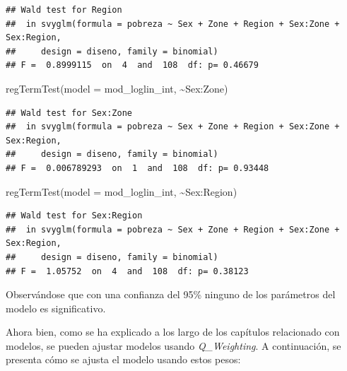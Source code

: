 \documentclass[
  12pt,
]{book}
\newenvironment{Shaded}{\begin{snugshade}}{\end{snugshade}}
\newcommand{\AttributeTok}[1]{\textcolor[rgb]{0.77,0.63,0.00}{#1}}
\newcommand{\FunctionTok}[1]{\textcolor[rgb]{0.00,0.00,0.00}{#1}}
\newcommand{\NormalTok}[1]{#1}
\newcommand{\SpecialCharTok}[1]{\textcolor[rgb]{0.00,0.00,0.00}{#1}}
\begin{document}
\begin{verbatim}
## Wald test for Region
##  in svyglm(formula = pobreza ~ Sex + Zone + Region + Sex:Zone + Sex:Region, 
##     design = diseno, family = binomial)
## F =  0.8999115  on  4  and  108  df: p= 0.46679
\end{verbatim}

\begin{Shaded}
\begin{Highlighting}[]
  \FunctionTok{regTermTest}\NormalTok{(}\AttributeTok{model =}\NormalTok{ mod\_loglin\_int, }\SpecialCharTok{\textasciitilde{}}\NormalTok{Sex}\SpecialCharTok{:}\NormalTok{Zone)}
\end{Highlighting}
\end{Shaded}

\begin{verbatim}
## Wald test for Sex:Zone
##  in svyglm(formula = pobreza ~ Sex + Zone + Region + Sex:Zone + Sex:Region, 
##     design = diseno, family = binomial)
## F =  0.006789293  on  1  and  108  df: p= 0.93448
\end{verbatim}

\begin{Shaded}
\begin{Highlighting}[]
  \FunctionTok{regTermTest}\NormalTok{(}\AttributeTok{model =}\NormalTok{ mod\_loglin\_int, }\SpecialCharTok{\textasciitilde{}}\NormalTok{Sex}\SpecialCharTok{:}\NormalTok{Region)}
\end{Highlighting}
\end{Shaded}

\begin{verbatim}
## Wald test for Sex:Region
##  in svyglm(formula = pobreza ~ Sex + Zone + Region + Sex:Zone + Sex:Region, 
##     design = diseno, family = binomial)
## F =  1.05752  on  4  and  108  df: p= 0.38123
\end{verbatim}

Observándose que con una confianza del 95\% ninguno de los parámetros del modelo es significativo.

Ahora bien, como se ha explicado a los largo de los capítulos relacionado con modelos, se pueden ajustar modelos usando \emph{Q\_Weighting}. A continuación, se presenta cómo se ajusta el modelo usando estos pesos:
\end{document}
